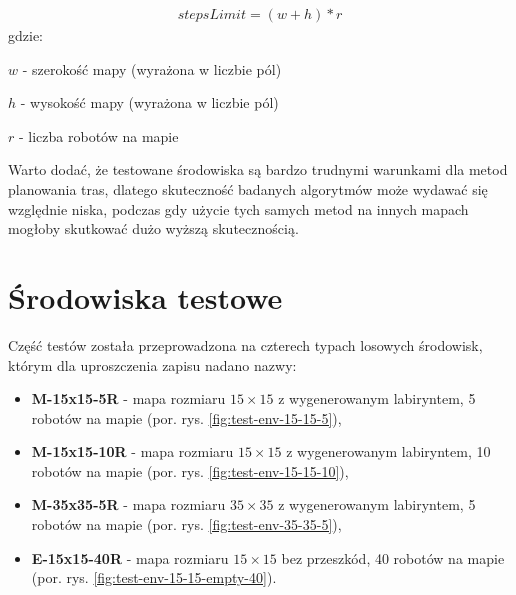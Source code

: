 \begin{gather}
 	stepsLimit = (w + h) * r
 	\label{eq:steps-limit} 
\end{gather}
 gdzie:

 $w$ - szerokość mapy (wyrażona w liczbie pól)

 $h$ - wysokość mapy (wyrażona w liczbie pól)

 $r$ - liczba robotów na mapie

Warto dodać, że testowane środowiska są bardzo trudnymi warunkami dla metod planowania tras, dlatego skuteczność badanych algorytmów może wydawać się względnie niska, podczas gdy użycie tych samych metod na innych mapach mogłoby skutkować dużo wyższą skutecznością.

\section{Środowiska testowe}
Część testów została przeprowadzona na czterech typach losowych środowisk, którym dla uproszczenia zapisu nadano nazwy:
\begin{itemize}
	\item {\bf M-15x15-5R} - mapa rozmiaru $15 \times 15$ z wygenerowanym labiryntem, 5 robotów na mapie (por. rys. \ref{fig:test-env-15-15-5}),
	\item {\bf M-15x15-10R} - mapa rozmiaru $15 \times 15$ z wygenerowanym labiryntem, 10 robotów na mapie (por. rys. \ref{fig:test-env-15-15-10}),
	\item {\bf M-35x35-5R} - mapa rozmiaru $35 \times 35$ z wygenerowanym labiryntem, 5 robotów na mapie (por. rys. \ref{fig:test-env-35-35-5}),
	\item {\bf E-15x15-40R} - mapa rozmiaru $15 \times 15$ bez przeszkód, 40 robotów na mapie (por. rys. \ref{fig:test-env-15-15-empty-40}).
\end{itemize}

